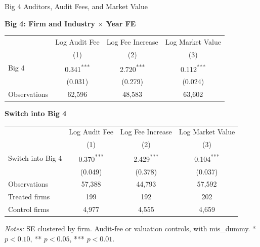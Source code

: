 \documentclass[10pt]{article}
\newcommand{\sym}[1]{\textsuperscript{#1}}
\begin{document}
\fontsize{10}{12}\selectfont
\setlength{\tabcolsep}{3pt}\renewcommand{\arraystretch}{1.15}
\begin{center}\large Big 4 Auditors, Audit Fees, and Market Value\end{center}
\medskip\textbf{Big 4: Firm and Industry $\times$ Year FE}\par\smallskip
\begin{tabular*}{\textwidth}{@{\extracolsep{\fill}}lccc@{}}
\toprule
 & Log Audit Fee & Log Fee Increase & Log Market Value \\
 & (1) & (2) & (3) \\
\midrule
Big 4 & 0.341\sym{***} & 2.720\sym{***} & 0.112\sym{***} \\
 & (0.031) & (0.279) & (0.024) \\
Observations & 62,596 & 48,583 & 63,602 \\
\bottomrule\end{tabular*}\par
\medskip\textbf{Switch into Big 4}\par\smallskip
\begin{tabular*}{\textwidth}{@{\extracolsep{\fill}}lccc@{}}
\toprule
 & Log Audit Fee & Log Fee Increase & Log Market Value \\
 & (1) & (2) & (3) \\
\midrule
Switch into Big 4 & 0.370\sym{***} & 2.429\sym{***} & 0.104\sym{***} \\
 & (0.049) & (0.378) & (0.037) \\
Observations & 57,388 & 44,793 & 57,592 \\
Treated firms & 199 & 192 & 202 \\
Control firms & 4,977 & 4,555 & 4,659 \\
\bottomrule\end{tabular*}\par
\medskip\fontsize{9}{11}\selectfont\textit{Notes:} SE clustered by firm. Audit-fee or valuation controls, with mis\_dummy. * $p<0.10$, ** $p<0.05$, *** $p<0.01$.
\end{document}
